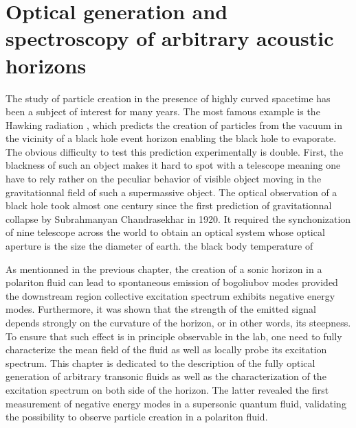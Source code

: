 


\graphicspath{{./}{./fig/}{./chap_custom_st/fig/}}

\chapter{Optical generation and spectroscopy of arbitrary acoustic horizons}

\label{chap:generation_transonic_fluid}

The study of particle creation in the presence of highly curved spacetime has been a subject of interest for many years. The most famous example is the Hawking radiation \cite{hawking_black_1972}, which predicts the creation of particles from the vacuum in the vicinity of a black hole event horizon enabling the black hole 
to evaporate. The obvious difficulty to test this prediction experimentally is double. First, the blackness of such an object makes it hard to spot with a telescope meaning one have to rely rather on the peculiar behavior of visible object moving in the gravitationnal field of such a supermassive object. The optical observation of a black hole took almost one century since the first prediction of gravitationnal collapse by Subrahmanyan Chandrasekhar in 1920. It required 
the synchonization of nine telescope across the world to obtain an optical system whose optical aperture is the size the diameter of earth. the black body temperature of 

As mentionned in the previous chapter, the creation of a sonic horizon in a polariton fluid can lead to spontaneous emission of bogoliubov modes provided the downstream region collective excitation spectrum
exhibits negative energy modes. Furthermore, it was shown that the strength of the emitted signal depends strongly on the curvature of the horizon, or in other words, its steepness. To ensure that such effect is in principle observable in the lab, one need to fully characterize the mean field of the fluid as well as locally probe its excitation spectrum. This chapter is dedicated to the description of the fully optical generation of arbitrary transonic fluids as well as the characterization of the excitation spectrum on both side of the horizon. 
The latter revealed the first measurement of negative energy modes in a supersonic quantum fluid, validating the possibility to observe particle creation in a polariton fluid.

